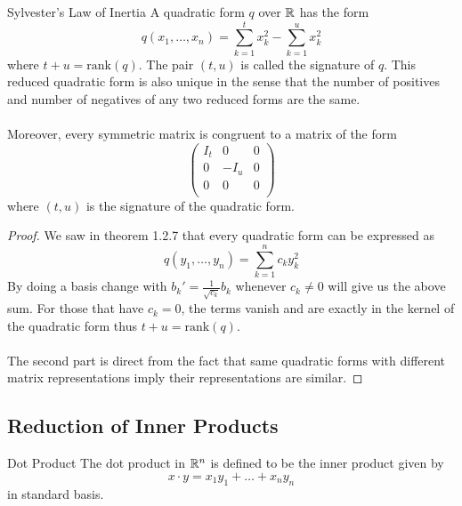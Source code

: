 \documentclass[a4paper]{article}
\begin{document}
\begin{prp}{Sylvester's Law of Inertia}{} A quadratic form $q$ over $\mathbb{R}$ has the form $$q(x_1,\dots,x_n)=\sum_{k=1}^tx_k^2-\sum_{k=1}^ux_k^2$$ where $t+u=\text{rank}(q)$. The pair $(t,u)$ is called the signature of $q$. This reduced quadratic form is also unique in the sense that the number of positives and number of negatives of any two reduced forms are the same. \\~\\ Moreover, every symmetric matrix is congruent to a matrix of the form $$\begin{pmatrix}
I_t & 0 & 0\\
0 & -I_u & 0\\
0 & 0 & 0\\
\end{pmatrix}$$ where $(t,u)$ is the signature of the quadratic form. \tcbline
\begin{proof}
We saw in theorem 1.2.7 that every quadratic form can be expressed as $$q(y_1,\dots,y_n)=\sum_{k=1}^nc_ky_k^2$$ By doing a basis change with $b_k'=\frac{1}{\sqrt{c_k}}b_k$ whenever $c_k\neq 0$ will give us the above sum. For those that have $c_k=0$, the terms vanish and are exactly in the kernel of the quadratic form thus $t+u=\text{rank}(q)$. \\~\\
The second part is direct from the fact that same quadratic forms with different matrix representations imply their representations are similar. 
\end{proof}
\end{prp}

\subsection{Reduction of Inner Products}
\begin{defn}{Dot Product}{} The dot product in $\mathbb{R}^n$ is defined to be the inner product given by $$x\cdot y=x_1y_1+\dots+x_ny_n$$ in standard basis. 
\end{defn}
\end{document}
